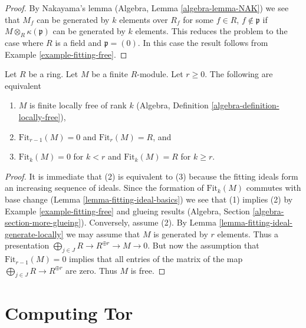 \begin{proof}
By Nakayama's lemma (Algebra, Lemma \ref{algebra-lemma-NAK}) we see that
$M_f$ can be generated by $k$ elements over $R_f$ for some
$f \in R$, $f \not \in \mathfrak p$ if $M \otimes_R \kappa(\mathfrak p)$
can be generated by $k$ elements. This reduces the problem to the
case where $R$ is a field and $\mathfrak p = (0)$. In this case
the result follows from Example \ref{example-fitting-free}.
\end{proof}

\begin{lemma}
\label{lemma-fitting-ideal-finite-locally-free}
Let $R$ be a ring. Let $M$ be a finite $R$-module. Let $r \geq 0$.
The following are equivalent
\begin{enumerate}
\item $M$ is finite locally free of rank $k$
(Algebra, Definition \ref{algebra-definition-locally-free}),
\item $\text{Fit}_{r - 1}(M) = 0$ and $\text{Fit}_r(M) = R$, and
\item $\text{Fit}_k(M) = 0$ for $k < r$ and $\text{Fit}_k(M) = R$
for $k \geq r$.
\end{enumerate}
\end{lemma}

\begin{proof}
It is immediate that (2) is equivalent to (3) because the fitting ideals
form an increasing sequence of ideals.
Since the formation of $\text{Fit}_k(M)$ commutes with base change
(Lemma \ref{lemma-fitting-ideal-basics}) we see that (1) implies (2) by
Example \ref{example-fitting-free}
and glueing results (Algebra, Section \ref{algebra-section-more-glueing}).
Conversely, assume (2). By
Lemma \ref{lemma-fitting-ideal-generate-locally} we may assume that $M$
is generated by $r$ elements. Thus a presentation
$\bigoplus_{j \in J} R \to R^{\oplus r} \to M \to 0$.
But now the assumption that $\text{Fit}_{r - 1}(M) = 0$ implies
that all entries of the matrix of the map
$\bigoplus_{j \in J} R \to R^{\oplus r}$ are zero.
Thus $M$ is free.
\end{proof}










\section{Computing Tor}
\label{section-computing-tor}

